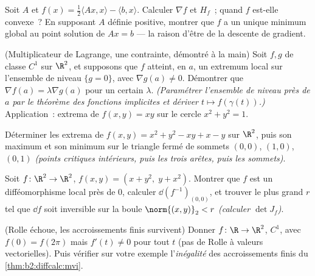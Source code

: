 \begin{exercise}[$\star\star$]\label{exo:b2:diffcalc:5}
Soit $A$  et $f(x) = \frac12\langle Ax, x\rangle -
\langle b, x\rangle$. Calculer $\nabla f$ et $H_f$~; quand $f$ est-elle
convexe~? En supposant $A$ définie positive, montrer que $f$ a un
unique minimum global au point solution de $Ax = b$ --- la raison
d'être de la descente de gradient.
\end{exercise}

\begin{exercise}[$\star\star$]\label{exo:b2:diffcalc:6}
(Multiplicateur de Lagrange, une contrainte, démontré à la main) Soit
$f, g$ de classe $C^1$ sur $\R^2$, et supposons que $f$ atteint, en
$a$, un extremum local sur l'ensemble de niveau $\{g = 0\}$, avec
$\nabla g(a) \neq 0$. Démontrer que $\nabla f(a) = \lambda\nabla g(a)$
pour un certain $\lambda$. \emph{(Paramétrer l'ensemble de niveau près
de $a$ par le théorème des fonctions implicites et dériver $t \mapsto
f(\gamma(t))$.)} Application~: extrema de $f(x,y) = xy$ sur le cercle
$x^2 + y^2 = 1$.
\end{exercise}

\begin{exercise}[$\star\star$]\label{exo:b2:diffcalc:7}
Déterminer les extrema de $f(x, y) = x^2 + y^2 - xy + x - y$ sur
$\R^2$, puis son maximum et son minimum sur le triangle fermé de
sommets $(0,0)$, $(1,0)$, $(0,1)$ \emph{(points critiques intérieurs,
puis les trois arêtes, puis les sommets)}.
\end{exercise}

\begin{exercise}[$\star\star\star$]\label{exo:b2:diffcalc:8}
Soit $f \colon \R^2 \to \R^2$, $f(x, y) = (x + y^2,\; y + x^2)$.
Montrer que $f$ est un difféomorphisme local près de $0$, calculer
$\dd(f^{-1})_{(0,0)}$, et trouver le plus grand $r$ tel que $\dd f$
soit inversible sur la boule $\norm{(x,y)}_2 < r$ \emph{(calculer
$\det J_f$)}.
\end{exercise}

\begin{exercise}[$\star\star\star$]\label{exo:b2:diffcalc:9}
(Rolle échoue, les accroissements finis survivent) Donner $f \colon
\R \to \R^2$, $C^1$, avec $f(0) = f(2\pi)$ mais $f'(t) \neq 0$ pour
tout $t$ (pas de Rolle à valeurs vectorielles). Puis vérifier sur
votre exemple l'\emph{inégalité} des accroissements finis du
\cref{thm:b2:diffcalc:mvi}.
\end{exercise}

